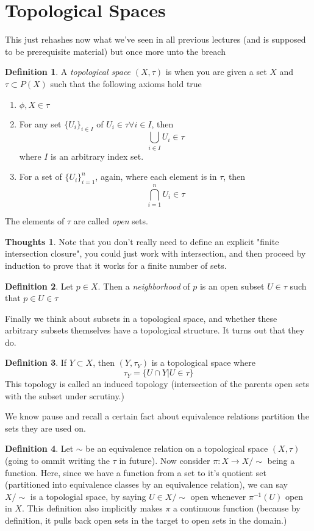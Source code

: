 \documentclass[12pt]{book}
\theoremstyle{definition}
\newtheorem*{definition}{Definition}
\newtheorem*{huh}{Thoughts}
\begin{document}
\section{Topological Spaces}
This just rehashes now what we've seen in all previous lectures (and is supposed to be prerequisite material) but once more unto the breach
\begin{definition}
    A \textit{topological space} $(X, \tau)$ is when you are given a set $X$ and $\tau \subset P(X)$ such that the following axioms hold true \begin{enumerate}
        \item $\phi, X \in \tau$
        \item For any set $\{U_i\}_{i \in I}$ of $U_i \in \tau \forall i \in I$, then $$ \bigcup_{i \in I} U_i \in \tau$$ where $I$ is an arbitrary index set. 
        \item For a set of $\{U_i\}_{i = 1}^n$, again, where each element is in $\tau$, then $$\bigcap_{i = 1}^n U_i \in \tau$$
    \end{enumerate}
    The elements of $\tau$ are called \textit{open} sets. 
    \begin{huh}Note that you don't really need to define an explicit "finite intersection closure", you could just work with intersection, and then proceed by induction to prove that it works for a finite number of sets.\end{huh}
\end{definition}
\begin{definition}
    Let $p \in X$. Then a \textit{neighborhood} of $p$ is an open subset $U \in \tau$ such that $p \in U \in \tau$
\end{definition}
Finally we think about subsets in a topological space, and whether these arbitrary subsets themselves have a topological structure. It turns out that they do.
\begin{definition}
    If $Y \subset X$, then $(Y, \tau_Y)$ is a topological space where $$\tau_Y = \{ U \cap Y | U \in \tau\}$$ This topology is called an induced topology (intersection of the parents open sets with the subset under scrutiny.)
\end{definition}
We know pause and recall a certain fact about equivalence relations partition the sets they are used on.
\begin{definition}
    Let $\sim$ be an equivalence relation on a topological space $(X, \tau)$ (going to ommit writing the $\tau$ in future). Now consider $\pi: X \to X/\sim$ being a function. Here, since we have a function from a set to it's quotient set (partitioned into equivalence classes by an equivalence relation), we can say $X/\sim$ is a topologial space, by saying $U \in X/\sim$ open whenever $\pi^{-1}(U)$ open in $X$. This definition also implicitly makes $\pi$ a continuous function (because by definition, it pulls back open sets in the target to open sets in the domain.)
\end{definition}
\end{document}
